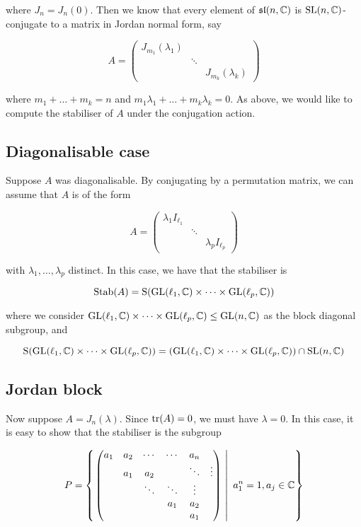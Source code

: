 \documentclass{article}
\renewcommand{\sl}{\mfs\mfl}
\newcommand{\rS}{\mathrm{S}}
\begin{document}
where \(J_n = J_n(0)\). Then we know that every element of \(\sl(n, \C)\) is \(\operatorname{SL}(n, \mathbb{C})\)-conjugate to a matrix in Jordan normal form, say

\[A = \begin{pmatrix}
    J_{m_1}(\lambda_1) \\
    & \ddots \\
    & & J_{m_k}(\lambda_k)
\end{pmatrix}\]

where \(m_1 + \dots + m_k = n\) and \(m_1\lambda_1 + \dots + m_k\lambda_k = 0\). As above, we would like to compute the stabiliser of \(A\) under the conjugation action.

\subsection{Diagonalisable case}

Suppose \(A\) was diagonalisable. By conjugating by a permutation matrix, we can assume that \(A\) is of the form

\[A = \begin{pmatrix}
    \lambda_1 I_{\ell_1} \\
    & \ddots \\
    & & \lambda_p I_{\ell_p}
\end{pmatrix}\]

with \(\lambda_1, \dots, \lambda_p\) distinct. In this case, we have that the stabiliser is

\[\Stab(A) = \rS(\GL(\ell_1, \C) \times \cdots \times \GL(\ell_p, \C))\]

where we consider \(\operatorname{GL}(\ell_1, \mathbb{C}) \times \cdots \times \operatorname{GL}(\ell_p, \mathbb{C}) \le \operatorname{GL}(n, \mathbb{C})\) as the block diagonal subgroup, and

\[\rS(\GL(\ell_1, \C) \times \cdots \times \GL(\ell_p, \C)) = \left(\GL(\ell_1, \C) \times \cdots \times \GL(\ell_p, \C)\right) \cap \SL(n, \C)\]

\subsection{Jordan block}

Now suppose \(A = J_n(\lambda)\). Since \(\tr(A) = 0\), we must have \(\lambda = 0\). In this case, it is easy to show that the stabiliser is the subgroup

\[P = \left\{\left.\begin{pmatrix}
    a_1 & a_2 & \cdots & \cdots & a_n \\
    & a_1 & a_2 & &\ddots & \vdots \\
    & & \ddots & \ddots & \vdots \\
    & & & a_1 & a_2 \\
    & & & & a_1
\end{pmatrix}\ \right\vert\ a_1^n = 1, a_j \in \mathbb{C} \right\}\]
\end{document}
